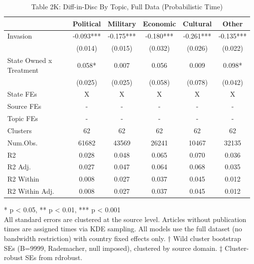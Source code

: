 \begin{table}[!t]
\caption{Table 2K: Diff-in-Disc By Topic, Full Data (Probabilistic Time)} 
\fontsize{12.0pt}{14.4pt}\selectfont
\begin{tabular*}{\linewidth}{@{\extracolsep{\fill}}lccccc}
\toprule
  & Political & Military & Economic & Cultural & Other \\ 
\midrule\addlinespace[2.5pt]
Invasion & -0.093*** & -0.175*** & -0.180*** & -0.261*** & -0.135*** \\ 
 & (0.014) & (0.015) & (0.032) & (0.026) & (0.022) \\ 
State Owned x Treatment & 0.058* & 0.007 & 0.056 & 0.009 & 0.098* \\ 
{} & {(0.025)} & {(0.025)} & {(0.058)} & {(0.078)} & {(0.042)} \\ 
State FEs & X & X & X & X & X \\ 
Source FEs & - & - & - & - & - \\ 
Topic FEs & - & - & - & - & - \\ 
Clusters & 62 & 62 & 62 & 62 & 62 \\ 
Num.Obs. & 61682 & 43569 & 26241 & 10467 & 32135 \\ 
R2 & 0.028 & 0.048 & 0.065 & 0.070 & 0.036 \\ 
R2 Adj. & 0.027 & 0.047 & 0.064 & 0.068 & 0.035 \\ 
R2 Within & 0.008 & 0.027 & 0.037 & 0.045 & 0.012 \\ 
R2 Within Adj. & 0.008 & 0.027 & 0.037 & 0.045 & 0.012 \\ 
\bottomrule
\end{tabular*}
\begin{minipage}{\linewidth}
* p < 0.05, ** p < 0.01, *** p < 0.001\\
All standard errors are clustered at the source level. Articles without
publication times are assigned times via KDE sampling. All models use the full
dataset (no bandwidth restriction) with country fixed effects only. † Wild
cluster bootstrap SEs (B=9999, Rademacher, null imposed), clustered by source
domain. ‡ Cluster-robust SEs from rdrobust.\\
\end{minipage}
\end{table}


